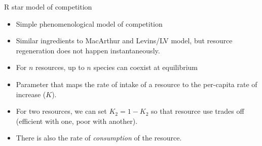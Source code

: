 \documentclass[12pt]{beamer}
\begin{document}



\begin{frame}{R star model of competition}
  \begin{itemize}
  \item Simple phenomenological model of competition
  \item Similar ingredients to MacArthur and Levins/LV model, but
    resource regeneration does not happen instantaneously.
  \item For $n$ resources, up to $n$ species can coexist at
    equilibrium
  \item Parameter that maps the rate of intake of a resource to the
    per-capita rate of increase ($K$).
  \item For two resources, we can set $K_2 = 1 - K_2$ so that resource
    use trades off (efficient with one, poor with another).
  \item There is also the rate of \emph{consumption} of the resource.
  \end{itemize}
\end{frame}


\end{document}
